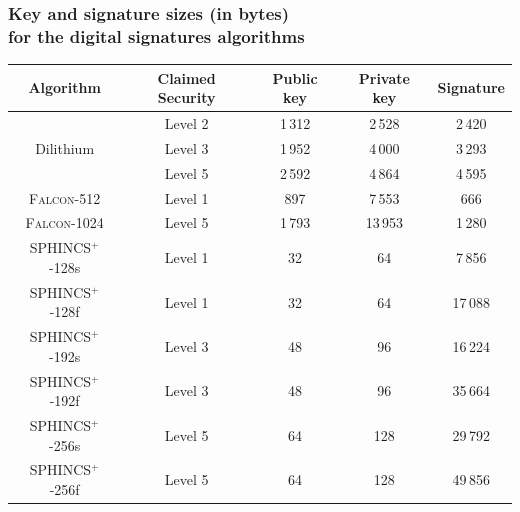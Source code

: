 \begin{frame}
    \frametitle{Key and signature sizes (in bytes)\\for the digital signatures algorithms}
    \begin{table}[h]
    \centering
    \begin{tabular}[p]{| c | c | c | c | c |}
        \hline
        \textbf{Algorithm} & \textbf{Claimed Security} & \textbf{Public key} & \textbf{Private key} & \textbf{Signature} \\ \hline
        \multirow{3}{*}{Dilithium} & Level 2 & 1\,312 & 2\,528 & 2\,420 \\
        & Level 3 & 1\,952 & 4\,000 & 3\,293 \\
        & Level 5 & 2\,592 & 4\,864 & 4\,595 \\
        \hline
        \textsc{Falcon}-512 & Level 1 & 897 & 7\,553 & 666 \\
        \textsc{Falcon}-1024 & Level 5 & 1\,793 & 13\,953 & 1\,280 \\
        \hline
        SPHINCS$^+$-128s & Level 1 & 32 & 64 & 7\,856 \\
        SPHINCS$^+$-128f & Level 1 & 32 & 64 & 17\,088 \\
        SPHINCS$^+$-192s & Level 3 & 48 & 96 & 16\,224 \\
        SPHINCS$^+$-192f & Level 3 & 48 & 96 & 35\,664 \\
        SPHINCS$^+$-256s & Level 5 & 64 & 128 & 29\,792 \\
        SPHINCS$^+$-256f & Level 5 & 64 & 128 & 49\,856 \\
        \hline
    \end{tabular}
    \end{table}
\end{frame}

